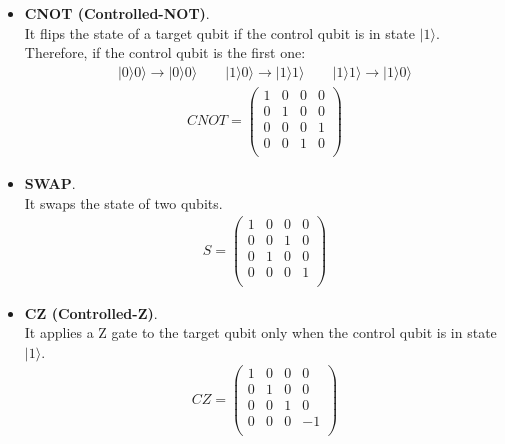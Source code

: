 \begin{itemize}
    \item \textbf{CNOT (Controlled-NOT)}.\\
    It flips the state of a target qubit if the control qubit is in state $| 1 \rangle$.
    Therefore, if the control qubit is the first one:
    \begin{align}
        | 0 \rangle 0 \rangle \rightarrow | 0 \rangle 0 \rangle
        \qquad 
        | 1 \rangle 0 \rangle \rightarrow | 1 \rangle 1 \rangle
        \qquad 
        | 1 \rangle 1 \rangle \rightarrow | 1 \rangle 0 \rangle
    \end{align}
    \begin{align}
        CNOT = \begin{pmatrix}
            1 & 0 & 0 & 0 \\
            0 & 1 & 0 & 0 \\
            0 & 0 & 0 & 1 \\
            0 & 0 & 1 & 0 \\
        \end{pmatrix}
    \end{align}
    \item \textbf{SWAP}.\\
    It swaps the state of two qubits.
    \begin{align}
        S = \begin{pmatrix}
            1 & 0 & 0 & 0 \\
            0 & 0 & 1 & 0 \\
            0 & 1 & 0 & 0 \\
            0 & 0 & 0 & 1 \\
        \end{pmatrix}
    \end{align}
    \item \textbf{CZ (Controlled-Z)}.\\
    It applies a Z gate to the target qubit only when the control qubit is in state $| 1 \rangle$.
    \begin{align}
        CZ = \begin{pmatrix}
            1 & 0 & 0 & 0 \\
            0 & 1 & 0 & 0 \\
            0 & 0 & 1 & 0 \\
            0 & 0 & 0 & -1 \\
        \end{pmatrix}
    \end{align}
\end{itemize}


